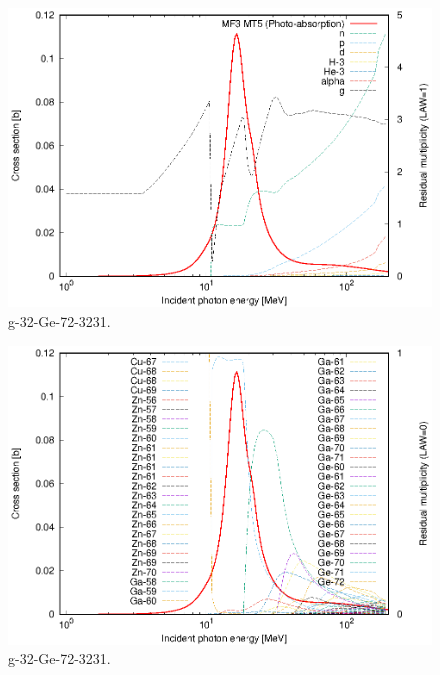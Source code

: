 \begin{figure}
 \includegraphics[width=\linewidth]{eps/g_32-Ge-72_3231.eps}
  \caption{g-32-Ge-72-3231.}
\end{figure}
\begin{figure}
 \includegraphics[width=\linewidth]{eps-law0/g_32-Ge-72_3231.eps}
 \caption{g-32-Ge-72-3231.}
\end{figure}
\newpage \clearpage

